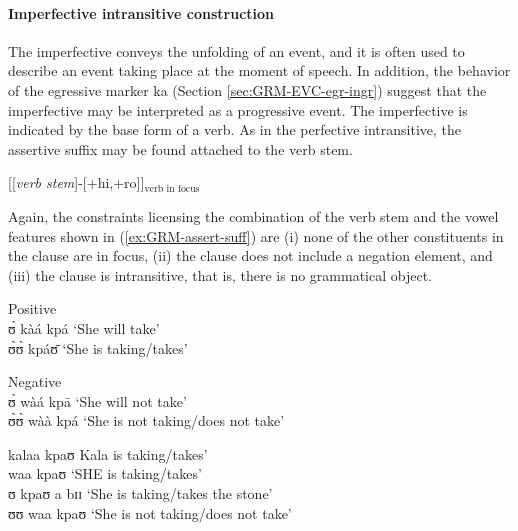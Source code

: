\begin{exe}
\begin{exe}
\begin{exe}
{\begin{exe}
\begin{exe}
\begin{exe}
\begin{exe}
\begin{exe}
\begin{exe}
\begin{exe}
\begin{exe}
\begin{exe}
\begin{exe}
\begin{exe}
\begin{exe}
\begin{exe}
\begin{exe}
\begin{exe}
\begin{exe}
\begin{exe}
\begin{exe}
\begin{exe}
\paragraph{Imperfective intransitive construction}
\label{sec:GRM-verb-perf-intran}

The imperfective  conveys the unfolding of an event, and it is often used to
describe an event taking place at the moment of speech. In addition, the
behavior of the egressive marker {\sls ka} (Section \ref{sec:GRM-EVC-egr-ingr})
suggest that the imperfective may be interpreted as a progressive event.  The 
imperfective is indicated by the base
form of a verb. As in the perfective intransitive, the assertive suffix may be
found attached to the verb stem. 


\ea\label{ex:GRM-assert-suff}
[[{\it verb stem}]-[{\sc +hi,+ro}]]$_\textrm{verb in focus}$
\z

Again, the constraints licensing the combination of the verb stem and the vowel
features  shown in (\ref{ex:GRM-assert-suff})   are (i) none of the other
constituents in the clause are in focus, (ii) the clause does not include
a negation element, and (iii) the clause is intransitive, that is, there is
no grammatical object. 





\ea\label{ex:GRM-pos-neg-take}
\ea\label{ex:GRM-ipfv-out-pos}{\rm Positive}\\
 ʊ̀ kàá kpá  {\rm `She will take'}\\
   ʊ̀ʊ̀ kpáʊ̄ {\rm `She  is taking/takes'}

\ex\label{ex:GRM-ipfv-out-neg}{\rm Negative}\\
 ʊ̀ wàá kpā  {\rm  `She will not take'}\\
   ʊ̀ʊ̀   wàà   kpá {\rm `She  is not taking/does not take'}

   
   \ex\label{ex:GRM-ipfv-out-nfoc}
 \textasteriskcentered kalaa kpaʊ {\rm Kala is taking/takes'}\\
   \ex\label{ex:GRM-ipfv-out-stpro}
 \textasteriskcentered waa kpaʊ {\rm `SHE is taking/takes'}\\
    \ex\label{ex:GRM-ipfv-out-obj}
  \textasteriskcentered ʊ kpaʊ a bɪɪ  {\rm `She  is taking/takes the 
stone'}\\
 \ex\label{ex:GRM-ipfv-out-neg}
   \textasteriskcentered   ʊʊ   waa   kpaʊ {\rm `She  is not taking/does 
not take'}


\end{exe}
\end{exe}
\end{exe}
\end{exe}
\end{exe}
\end{exe}
\end{exe}
\end{exe}
\end{exe}
\end{exe}
\end{exe}
\end{exe}
\end{exe}
\end{exe}
\end{exe}
\end{exe}
\end{exe}
\end{exe}
\end{exe}}
\end{exe}
\end{exe}
\end{exe}
